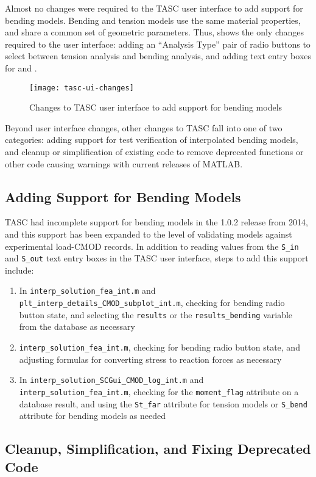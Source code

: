 Almost no changes were required to the TASC user interface to add support for bending models.
Bending and tension models use the same material properties, and share a common set of geometric parameters.
Thus,  shows the only changes required to the user interface: adding an ``Analysis Type'' pair of radio buttons to select between tension analysis and bending analysis, and adding text entry boxes for \Sinner and \Souter.
\begin{figure}[bp]
\centering
\texttt{[image: tasc-ui-changes]}
\caption{\label{fig:tasc-ui-changes} Changes to TASC user interface to add support for bending models}
\end{figure}
Beyond user interface changes, other changes to TASC fall into one of two categories: adding support for test verification of interpolated bending models, and cleanup or simplification of existing code to remove deprecated functions or other code causing warnings with current releases of MATLAB.


\subsection{Adding Support for Bending Models}

TASC had incomplete support for bending models in the 1.0.2 release from 2014, and this support has been expanded to the level of validating models against experimental load-CMOD records. In addition to reading values from the \verb|S_in| and \verb|S_out| text entry boxes in the TASC user interface, steps to add this support include:
\begin{enumerate}
\item In \verb|interp_solution_fea_int.m| and \verb|plt_interp_details_CMOD_subplot_int.m|, checking for bending radio button state, and selecting the \verb|results| or the \verb|results_bending| variable from the database as necessary
\item \verb|interp_solution_fea_int.m|, checking for bending radio button state, and adjusting formulas for converting stress to reaction forces as necessary
\item In \verb|interp_solution_SCGui_CMOD_log_int.m| and \verb|interp_solution_fea_int.m|, checking for the \verb|moment_flag| attribute on a database result, and using the \verb|St_far| attribute for tension models or \verb|S_bend| attribute for bending models as needed
\end{enumerate}

\subsection{Cleanup, Simplification, and Fixing Deprecated Code}

